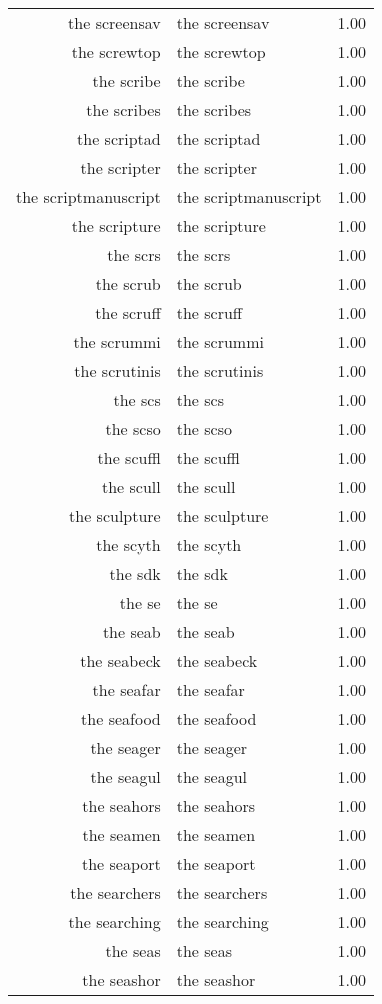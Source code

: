 \begin{table}[ht]
\begin{tabular}{rlr}
  the screensav & the screensav & 1.00 \\ 
  the screwtop & the screwtop & 1.00 \\ 
  the scribe & the scribe & 1.00 \\ 
  the scribes & the scribes & 1.00 \\ 
  the scriptad & the scriptad & 1.00 \\ 
  the scripter & the scripter & 1.00 \\ 
  the scriptmanuscript & the scriptmanuscript & 1.00 \\ 
  the scripture & the scripture & 1.00 \\ 
  the scrs & the scrs & 1.00 \\ 
  the scrub & the scrub & 1.00 \\ 
  the scruff & the scruff & 1.00 \\ 
  the scrummi & the scrummi & 1.00 \\ 
  the scrutinis & the scrutinis & 1.00 \\ 
  the scs & the scs & 1.00 \\ 
  the scso & the scso & 1.00 \\ 
  the scuffl & the scuffl & 1.00 \\ 
  the scull & the scull & 1.00 \\ 
  the sculpture & the sculpture & 1.00 \\ 
  the scyth & the scyth & 1.00 \\ 
  the sdk & the sdk & 1.00 \\ 
  the se & the se & 1.00 \\ 
  the seab & the seab & 1.00 \\ 
  the seabeck & the seabeck & 1.00 \\ 
  the seafar & the seafar & 1.00 \\ 
  the seafood & the seafood & 1.00 \\ 
  the seager & the seager & 1.00 \\ 
  the seagul & the seagul & 1.00 \\ 
  the seahors & the seahors & 1.00 \\ 
  the seamen & the seamen & 1.00 \\ 
  the seaport & the seaport & 1.00 \\ 
  the searchers & the searchers & 1.00 \\ 
  the searching & the searching & 1.00 \\ 
  the seas & the seas & 1.00 \\ 
  the seashor & the seashor & 1.00 \\ 

\end{tabular}
\end{table}
